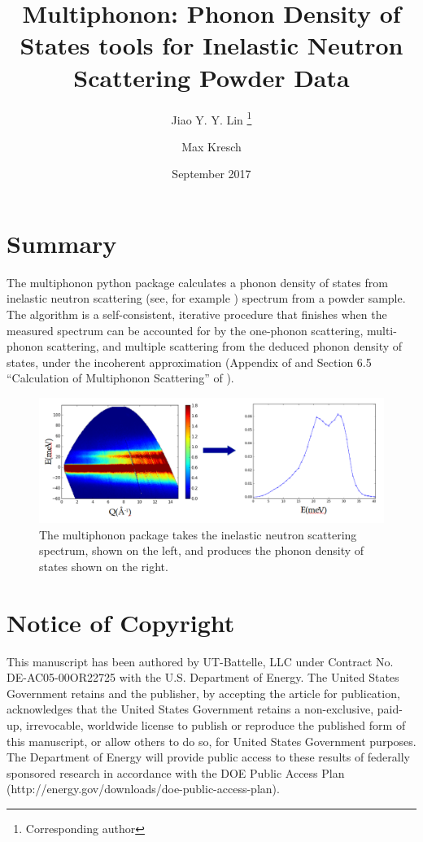\documentclass{article}
\title{Multiphonon: Phonon Density of States tools for Inelastic Neutron Scattering Powder Data}
\author[1]{Jiao Y. Y. Lin \thanks{Corresponding author}}
\author[2]{Max Kresch}
\affil[1]{linjiao@ornl.gov, Neutron Data Analysis and Visualization Division, Oak Ridge National Lab}
\affil[2]{mkresch@gmail.com}
\date{September 2017}
\begin{document}
\maketitle

\section{Summary}\label{summary}

The multiphonon python package calculates a phonon density of states from
inelastic neutron scattering (see, for example \cite{FultzINSbook})
spectrum from a powder sample. The algorithm is a self-consistent,
iterative procedure that finishes when
the measured spectrum can be accounted for by
the one-phonon scattering, multi-phonon scattering, and multiple
scattering from the deduced phonon density of states, under the
incoherent approximation (Appendix of \cite{KreschNickel2007} and
Section 6.5 ``Calculation of Multiphonon Scattering'' of
\cite{FultzINSbook}).

\begin{figure}
  \includegraphics[scale=0.25]{sqe2dos}
  \caption{The multiphonon package takes the inelastic neutron scattering spectrum, shown on the left, and produces the phonon density of states shown on the right.}
\end{figure}


\section{Notice of Copyright}\label{notice-of-copyright}

This manuscript has been authored by UT-Battelle, LLC under Contract No.
DE-AC05-00OR22725 with the U.S. Department of Energy. The United States
Government retains and the publisher, by accepting the article for
publication, acknowledges that the United States Government retains a
non-exclusive, paid-up, irrevocable, worldwide license to publish or
reproduce the published form of this manuscript, or allow others to do
so, for United States Government purposes. The Department of Energy will
provide public access to these results of federally sponsored research
in accordance with the DOE Public Access Plan
(http://energy.gov/downloads/doe-public-access-plan).
\end{document}
